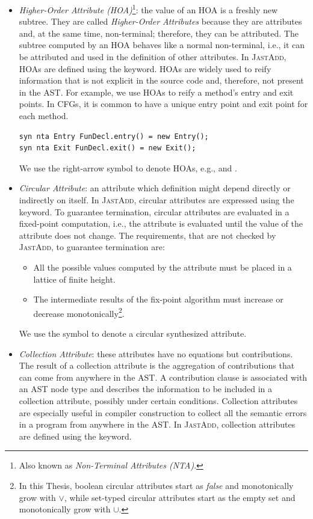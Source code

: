\begin{itemize}
    \item \emph{Higher-Order Attribute (HOA)}\footnote{Also known as \emph{Non-Terminal Attributes (NTA)}.}:
    the value of an HOA is a freshly new subtree. They are called \emph{Higher-Order Attributes}
    because they are attributes and, at the same time, non-terminal; therefore, they can be attributed.
    The subtree computed by an HOA behaves like a normal non-terminal, i.e., it can be
    attributed and used in the definition of other attributes. In \textsc{JastAdd}, HOAs
    are defined using the  keyword. HOAs are widely used to reify information
    that is not explicit in the source code and, therefore, not present in the AST.
    For example, we use HOAs to reify a method's entry and exit points. In CFGs, it
    is common to have a unique entry point and exit point for each method.
    \begin{lstlisting}[language=JastAdd]
syn nta Entry FunDecl.entry() = new Entry();
syn nta Exit FunDecl.exit() = new Exit();
    \end{lstlisting}
    We use the right-arrow symbol to denote HOAs, e.g.,   and .
    \item \emph{Circular Attribute}: an attribute which definition might depend directly
    or indirectly on itself. In \textsc{JastAdd}, circular attributes are expressed using the 
    keyword. To guarantee termination, circular attributes are evaluated in a fixed-point
    computation, i.e., the attribute is evaluated until the value of the attribute does not change.
    The requirements, that are not checked by \textsc{JastAdd}, to guarantee termination are:
    \begin{itemize}
        \item All the possible values computed by the attribute must be placed
        in a lattice of finite height.
        \item The intermediate results of the fix-point algorithm must increase
        or decrease monotonically\footnote{In this Thesis, boolean circular attributes start
        as \emph{false} and monotonically grow with $\vee$, while set-typed circular attributes
        start as the empty set and monotonically grow with $\cup$.}.
    \end{itemize}
    We use the symbol  to denote a circular synthesized attribute.

    \item \emph{Collection Attribute}: these attributes have no equations but contributions. The
    result of a collection attribute is the aggregation of contributions that can
    come from anywhere in the AST. A contribution clause is associated with
    an AST node type and describes the information to be included in a collection
    attribute, possibly under certain conditions. Collection attributes are especially
    useful in compiler construction to collect all the semantic errors in a program
    from anywhere in the AST. In \textsc{JastAdd}, collection attributes are defined using the
     keyword.


\end{itemize}
